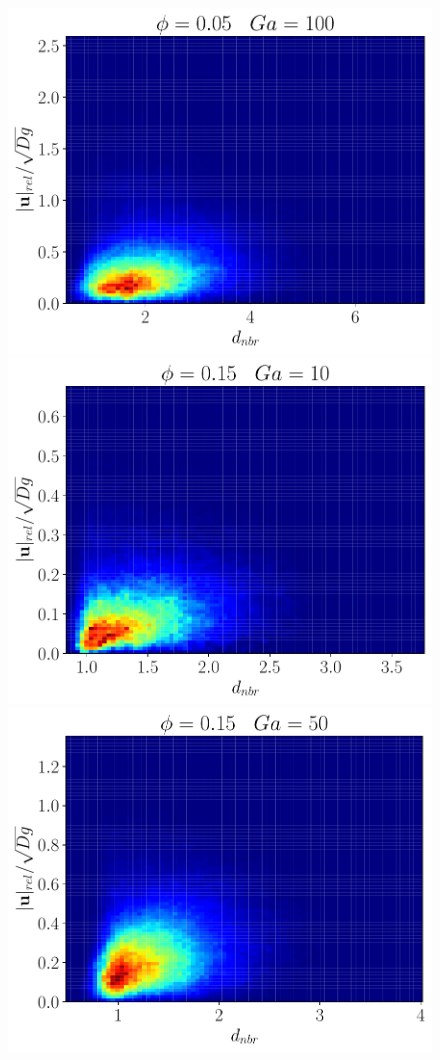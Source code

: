 \begin{figure}[h!]
    \includegraphics[height = \size]{image/N_10/beta/2DMAP_distmin_v_rel_dmax_10_Bo1PHI0_05mu_r0_42Ga100.pdf}
    \includegraphics[height = \size]{image/N_10/beta/2DMAP_distmin_v_rel_dmax_10_Bo1PHI0_15mu_r0_42Ga10.pdf}
    \includegraphics[height = \size]{image/N_10/beta/2DMAP_distmin_v_rel_dmax_10_Bo1PHI0_15mu_r0_42Ga50.pdf}

\end{figure}
